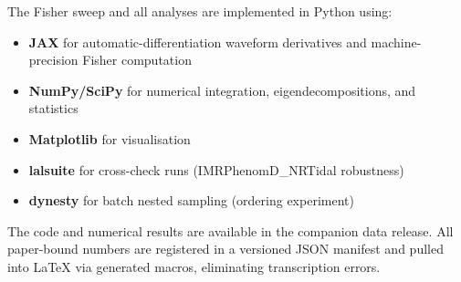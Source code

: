 \documentclass[twocolumn,prd,showpacs,superscriptaddress]{revtex4-2}
\begin{document}
The Fisher sweep and all analyses are implemented in Python using:
\begin{itemize}
\item \textbf{JAX} for automatic-differentiation waveform derivatives and machine-precision Fisher computation
\item \textbf{NumPy/SciPy} for numerical integration, eigendecompositions, and statistics
\item \textbf{Matplotlib} for visualisation
\item \textbf{lalsuite} for cross-check runs (IMRPhenomD\_NRTidal robustness)
\item \textbf{dynesty} for batch nested sampling (ordering experiment)
\end{itemize}

The code and numerical results are available in the companion data release. All paper-bound numbers are registered in a versioned JSON manifest and pulled into LaTeX via generated macros, eliminating transcription errors.
\end{document}
